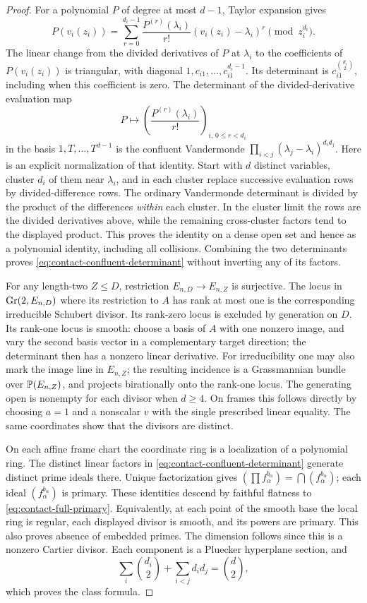\begin{proof}
For a polynomial $P$ of degree at most $d-1$, Taylor expansion gives
\[
 P(v_i(z_i))=\sum_{r=0}^{d_i-1}
             \frac{P^{(r)}(\lambda_i)}{r!}
                    (v_i(z_i)-\lambda_i)^r\pmod {z_i^{d_i}}.
\]
The linear change from the divided derivatives of $P$ at $\lambda_i$
to the coefficients of $P(v_i(z_i))$ is triangular, with diagonal
$1,c_{i1},\ldots,c_{i1}^{d_i-1}$. Its determinant is
$c_{i1}^{\binom{d_i}{2}}$, including when this coefficient is zero.
The determinant of the divided-derivative evaluation map
\[
 P\longmapsto\left(\frac{P^{(r)}(\lambda_i)}{r!}\right)_{i,\,0\le r<d_i}
\]
in the basis $1,T,\ldots,T^{d-1}$ is the confluent Vandermonde
$\prod_{i<j}(\lambda_j-\lambda_i)^{d_i d_j}$. Here is an explicit
normalization of that identity. Start with $d$ distinct variables,
cluster $d_i$ of them near $\lambda_i$, and in each cluster replace
successive evaluation rows by divided-difference rows. The ordinary
Vandermonde determinant is divided by the product of the differences
\emph{within} each cluster. In the cluster limit the rows are the
divided derivatives above, while the remaining cross-cluster
factors tend to the displayed product. This proves the identity on
a dense open set and hence as a polynomial identity, including all
collisions. Combining the two determinants proves
\eqref{eq:contact-confluent-determinant} without inverting any of
its factors.

For any length-two $Z\le D$, restriction $E_{n,D}\to E_{n,Z}$ is
surjective. The locus in $\operatorname{Gr}(2,E_{n,D})$ where its restriction to
$A$ has rank at most one is the corresponding irreducible Schubert
divisor. Its rank-zero locus is excluded by generation on $D$.
Its rank-one locus is smooth: choose a basis of $A$ with one nonzero
image, and vary the second basis vector in a complementary target
direction; the determinant then has a nonzero linear derivative.
For irreducibility one may also mark the image line in $E_{n,Z}$;
the resulting incidence is a Grassmannian bundle over $\mathbb P(E_{n,Z})$,
and projects birationally onto the rank-one locus. The generating
open is nonempty for each divisor when $d\ge4$. On frames this
follows directly by choosing $a=1$ and a nonscalar $v$ with the
single prescribed linear equality. The same coordinates show that
the divisors are distinct.

On each affine frame chart the coordinate ring is a localization of
a polynomial ring. The distinct linear factors in
\eqref{eq:contact-confluent-determinant} generate distinct prime
ideals there. Unique factorization gives
$(\prod f_\alpha^{b_\alpha})=\bigcap(f_\alpha^{b_\alpha})$;
each ideal $(f_\alpha^{b_\alpha})$ is primary. These identities
descend by faithful flatness to \eqref{eq:contact-full-primary}.
Equivalently, at each point of the smooth base the local ring is
regular, each displayed divisor is smooth, and its powers are
primary. This also proves absence of embedded primes. The dimension
follows since this is a nonzero Cartier divisor. Each component is
a Pluecker hyperplane section, and
\[
 \sum_i\binom{d_i}{2}+\sum_{i<j}d_i d_j=\binom d2,
\]
which proves the class formula.


\end{proof}

